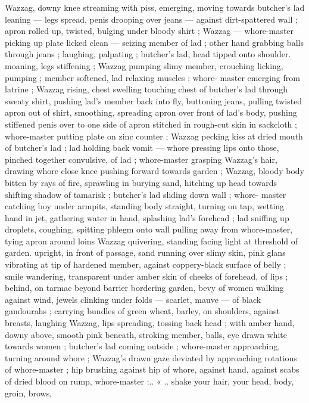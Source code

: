 Wazzag, downy knee streaming with piss, emerging, moving towards
butcher's lad leaning --- legs spread, penis drooping over jeans ---
against dirt-spattered wall ; apron rolled up, twisted, bulging under
bloody shirt ; Wazzag --- whore-master picking up plate licked clean
--- seizing member of lad ; other hand grabbing balls through jeans
; laughing, palpating ; butcher's lad, head tipped onto shoulder.
moaning, legs stiffening ; Wazzag pumping slimy member, crouching
licking, pumping ; member softened, lad relaxing muscles ; whore-
master emerging from latrine ; Wazzag rising, chest swelling
touching chest of butcher's lad through sweaty shirt, pushing lad’s
member back into fly, buttoning jeans, pulling twisted apron out of
shirt, smoothing, spreading apron over front of lad’s body, pushing
stiffened penis over to one side of apron stitched in rough-cut skin
in sackcloth ; whore-master putting plate on zinc counter ; Wazzag
pecking kiss at dried mouth of butcher's lad ; lad holding back vomit
--- whore pressing lips onto those, pinched together convulsive, of
lad ; whore-master grasping Wazzag's hair, drawing whore close
knee pushing forward towards garden ; Wazzag, bloody body bitten
by rays of fire, sprawling in burying sand, hitching up head towards
shifting shadow of tamarisk ; butcher's lad sliding down wall ; whore-
master catching boy under armpits, standing body straight, turning
on tap, wetting hand in jet, gathering water in hand, splashing lad's
forehead ; lad sniffing up droplets, coughing, spitting phlegm onto
wall pulling away from whore-master, tying apron around loins
Wazzag quivering, standing facing light at threshold of garden.
upright, in front of passage, sand running over slimy skin, pink glans
vibrating at tip of hardened member, against coppery-black surface
of belly ; smile wandering, transparent under amber skin of cheeks
of forehead, of lips ; behind, on tarmac beyond barrier bordering
garden, bevy of women walking against wind, jewels clinking under
folds --- scarlet, mauve --- of black gandourahs ; carrying bundles
of green wheat, barley, on shoulders, against breasts, laughing
Wazzag, lips spreading, tossing back head ; with amber hand, downy
above, smooth pink beneath, stroking member, balls, eye drawn
white towards women ; butcher's lad coming outside ; whore-master
approaching, turning around whore ; Wazzag's drawn gaze deviated
by approaching rotations of whore-master ; hip brushing against hip
of whore, against hand, against scabs of dried blood on rump,
whore-master :.. « .. shake your hair, your head, body, groin, brows,
